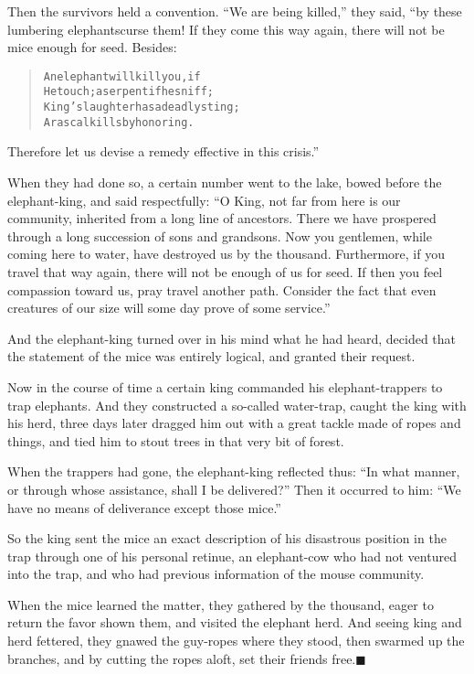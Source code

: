 \documentclass[article, twoside, 14pt]{memoir}
\newcommand{\qed}{\hfill \ensuremath{\blacksquare}}
\renewenvironment{verbatim}{%
\begin{quote}%
\vskip -10pt%
\begin{alltt}\normalfont\large}{\end{alltt}%
\end{quote}%
\vskip -10pt
} %
\begin{document}
Then the survivors held a convention. ``We are being killed,'' they
said, “by these lumbering elephants{\textemdash}curse them! If they come this
way again, there will not be mice enough for seed. Besides:

\begin{verbatim}
An elephant will kill you, if
He touch; a serpent if he sniff;
King's laughter has a deadly sting;
A rascal kills by honoring.
\end{verbatim}
Therefore let us devise a remedy effective in this crisis.”

When they had done so, a certain number went to the lake, bowed
before the elephant-king, and said respectfully:
``O King, not far from here is our community, inherited from a long line of ancestors. There we have prospered through a long succession of sons and grandsons. Now you gentlemen, while coming here to water, have destroyed us by the thousand. Furthermore, if you travel that way again, there will not be enough of us for seed. If then you feel compassion toward us, pray travel another path. Consider the fact that even creatures of our size will some day prove of some service.''

And the elephant-king turned over in his mind what he had heard,
decided that the statement of the mice was entirely logical, and
granted their request.

Now in the course of time a certain king commanded his
elephant-trappers to trap elephants. And they constructed a
so-called water-trap, caught the king with his herd, three days
later dragged him out with a great tackle made of ropes and things,
and tied him to stout trees in that very bit of forest.

When the trappers had gone, the elephant-king reflected thus:
``In what manner, or through whose assistance, shall I be delivered?''
Then it occurred to him:
``We have no means of deliverance except those mice.''

So the king sent the mice an exact description of his disastrous
position in the trap through one of his personal retinue, an
elephant-cow who had not ventured into the trap, and who had
previous information of the mouse community.

When the mice learned the matter, they gathered by the thousand,
eager to return the favor shown them, and visited the elephant
herd. And seeing king and herd fettered, they gnawed the guy-ropes
where they stood, then swarmed up the branches, and by cutting the
ropes aloft, set their friends free.\hyperref[s44]{\qed}
\end{document}
